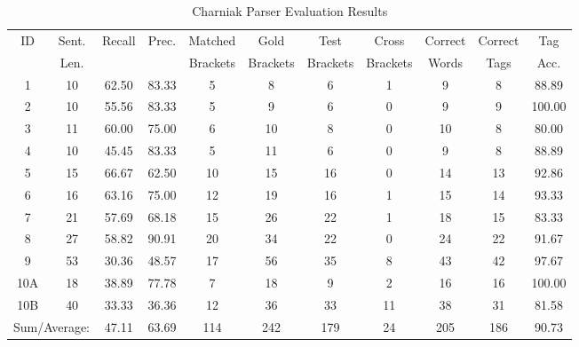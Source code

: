 \begin{table*}[htbp!]
\centering
\begin{tabular}{@{}ccccccccccc@{}}
\toprule
ID & Sent. & Recall & Prec. & Matched & Gold & Test & Cross & Correct & Correct & Tag \\
 & Len. & & & Brackets & Brackets & Brackets & Brackets & Words & Tags & Acc. \\
\midrule
1 & 10 & 62.50 & 83.33 & 5 & 8 & 6 & 1 & 9 & 8 & 88.89 \\
2 & 10 & 55.56 & 83.33 & 5 & 9 & 6 & 0 & 9 & 9 & 100.00 \\
3 & 11 & 60.00 & 75.00 & 6 & 10 & 8 & 0 & 10 & 8 & 80.00 \\
4 & 10 & 45.45 & 83.33 & 5 & 11 & 6 & 0 & 9 & 8 & 88.89 \\
5 & 15 & 66.67 & 62.50 & 10 & 15 & 16 & 0 & 14 & 13 & 92.86 \\
6 & 16 & 63.16 & 75.00 & 12 & 19 & 16 & 1 & 15 & 14 & 93.33 \\
7 & 21 & 57.69 & 68.18 & 15 & 26 & 22 & 1 & 18 & 15 & 83.33 \\
8 & 27 & 58.82 & 90.91 & 20 & 34 & 22 & 0 & 24 & 22 & 91.67 \\
9 & 53 & 30.36 & 48.57 & 17 & 56 & 35 & 8 & 43 & 42 & 97.67 \\
10A & 18 & 38.89 & 77.78 & 7 & 18 & 9 & 2 & 16 & 16 & 100.00 \\
10B & 40 & 33.33 & 36.36 & 12 & 36 & 33 & 11 & 38 & 31 & 81.58 \\
\midrule
\multicolumn{2}{l}{Sum/Average:} & 47.11 & 63.69 & 114 & 242 & 179 & 24 & 205 & 186 & 90.73 \\
\bottomrule
\end{tabular}
\caption{Charniak Parser Evaluation Results}
\label{{tab:parser_eval}}
\end{table*}
